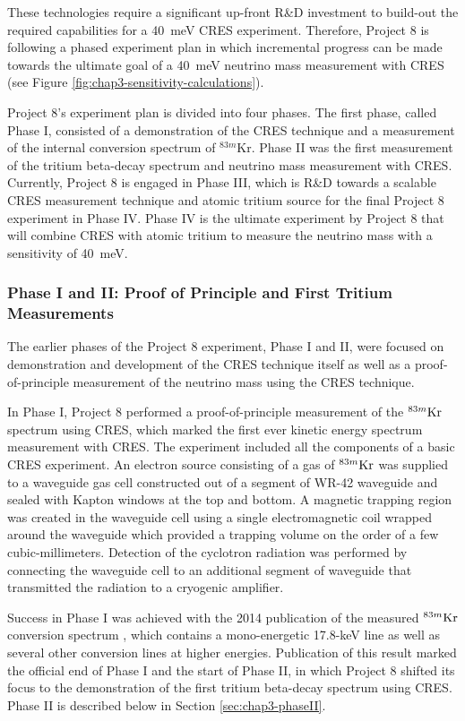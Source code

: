 These technologies require a significant up-front R\&D investment to build-out the required capabilities for a 40~meV CRES experiment. Therefore, Project 8 is following a phased experiment plan in which incremental progress can be made towards the ultimate goal of a 40~meV neutrino mass measurement with CRES (see Figure \ref{fig:chap3-sensitivity-calculations}).

Project 8's experiment plan is divided into four phases. The first phase, called Phase I, consisted of a demonstration of the CRES technique and a measurement of the internal conversion spectrum of $^{83m}$Kr. Phase II was the first measurement of the tritium beta-decay spectrum and neutrino mass measurement with CRES. Currently, Project 8 is engaged in Phase III, which is R\&D towards a scalable CRES measurement technique and atomic tritium source for the final Project 8 experiment in Phase IV. Phase IV is the ultimate experiment by Project 8 that will combine CRES with atomic tritium to measure the neutrino mass with a sensitivity of 40~meV. 

\subsubsection*{Phase I and II: Proof of Principle and First Tritium Measurements}

The earlier phases of the Project 8 experiment, Phase I and II, were focused on demonstration and development of the CRES technique itself as well as a proof-of-principle measurement of the neutrino mass using the CRES technique.

In Phase I, Project 8 performed a proof-of-principle measurement of the $^{83m}\rm{Kr}$ spectrum using CRES, which marked the first ever kinetic energy spectrum measurement with CRES. The experiment included all the components of a basic CRES experiment. An electron source consisting of a gas of $^{83m}\rm{Kr}$ was supplied to a waveguide gas cell constructed out of a segment of WR-42 waveguide and sealed with Kapton windows at the top and bottom. A magnetic trapping region was created in the waveguide cell using a single electromagnetic coil wrapped around the waveguide which provided a trapping volume on the order of a few cubic-millimeters. Detection of the cyclotron radiation was performed by connecting the waveguide cell to an additional segment of waveguide that transmitted the radiation to a cryogenic amplifier.

Success in Phase I was achieved with the 2014 publication of the measured $^{83m}\rm{Kr}$ conversion spectrum \cite{Project8:2014ivu}, which contains a mono-energetic 17.8-keV line as well as several other conversion lines at higher energies. Publication of this result marked the official end of Phase I and the start of Phase II, in which Project 8 shifted its focus to the demonstration of the first tritium beta-decay spectrum using CRES. Phase II is described below in Section \ref{sec:chap3-phaseII}.

